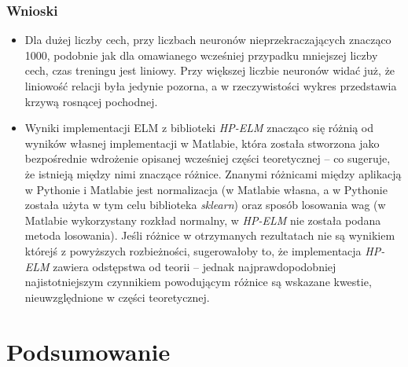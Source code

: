 \documentclass{article}
\begin{document}
\subsubsection{Wnioski}
\begin{itemize}
\item Dla dużej liczby cech, przy liczbach neuronów nieprzekraczających znacząco 1000, podobnie jak dla omawianego wcześniej przypadku mniejszej liczby cech, czas treningu jest liniowy. Przy większej liczbie neuronów widać już, że liniowość relacji była jedynie pozorna, a w rzeczywistości wykres przedstawia krzywą rosnącej pochodnej.
\item Wyniki implementacji ELM z biblioteki \textit{HP-ELM} znacząco się różnią od wyników własnej implementacji w Matlabie, która została stworzona jako bezpośrednie wdrożenie opisanej wcześniej części teoretycznej -- co sugeruje, że istnieją między nimi znaczące różnice. Znanymi różnicami między aplikacją w Pythonie i Matlabie jest normalizacja (w Matlabie własna, a w Pythonie została użyta w tym celu biblioteka \textit{sklearn}) oraz sposób losowania wag (w Matlabie wykorzystany rozkład normalny, w \textit{HP-ELM} nie została podana metoda losowania). Jeśli różnice w otrzymanych rezultatach nie są wynikiem którejś z powyższych rozbieżności, sugerowałoby to, że implementacja \textit{HP-ELM} zawiera odstępstwa od teorii -- jednak najprawdopodobniej najistotniejszym czynnikiem powodującym różnice są wskazane kwestie, nieuwzględnione w części teoretycznej.
\end{itemize}



\clearpage
\section*{Podsumowanie}

\clearpage
{}
\end{document}
